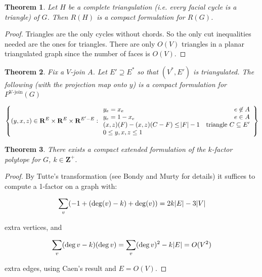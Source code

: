 \documentclass{article}
\newtheorem{theorem}{Theorem}
\begin{document}
\begin{theorem}
Let $H$ be a complete triangulation (i.e. every facial cycle is a triangle) of $G$. Then  $R(H)$ is a compact formulation for $R(G)$.
\end{theorem}
\begin{proof}
Triangles are the only cycles without chords. So
the only cut inequalities needed are the ones for triangles. 
There are only $O(V)$ triangles in a planar triangulated graph since the number of faces is $O(V)$. 
\end{proof}


\begin{theorem}
Fix a $V$-join $A$.
Let $E'\supseteq E^*$ so that $(V^*, E')$ is triangulated.
The following (with the projection map onto $y$) is a compact formulation for $P^{\text{V-join}}(G)$

$$\cbr{(y,x,z)\in\mathbf{R}^E\times\mathbf{R}^E\times\mathbf{R}^{E'-E}:
\begin{array}{lr}
y_e = x_e & e\not\in A \\
y_e = 1-x_e & e\in A \\
(x,z)(F) - (x,z)(C-F) \leq \abs{F}-1 & \text{triangle $C \subseteq E'$} \\
0 \leq y,x,z \leq 1
\end{array}
}$$
\end{theorem}

\begin{theorem}
There exists a compact extended formulation of the $k$-factor polytope for $G$,
$k\in\mathbf{Z}^+$.
\end{theorem}
\begin{proof}
By Tutte's transformation (see Bondy and Murty for details) 
it suffices to  compute a 1-factor on a graph with:

$$\sum_{v} (-1 + (\deg(v)-k) + \deg(v)) = 2k\abs{E}-3\abs{V}$$

extra vertices, and

$$\sum_{v} (\deg v - k)(\deg v) = \sum_{v}(\deg v)^2 - k\abs{E} = O(V^2)$$

extra edges, using Caen's result and $E = O(V)$.
\end{proof}
\end{document}
